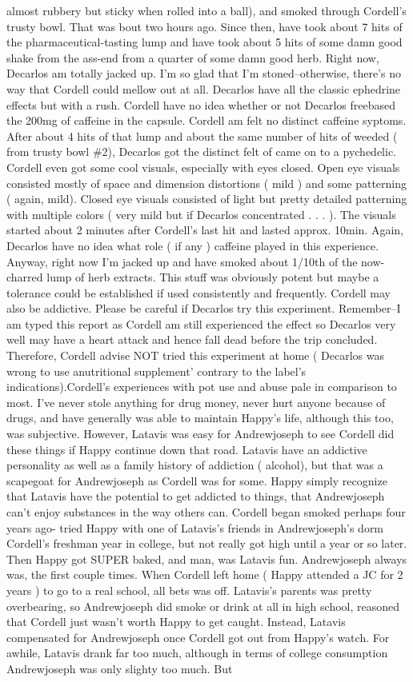 \documentclass[12pt]{book}
\begin{document}
almost rubbery but sticky when rolled into a ball), and smoked through Cordell's trusty bowl. That was bout two hours ago. Since then, have took about 7 hits of the pharmaceutical-tasting lump and have took about 5 hits of some damn good shake from the ass-end from a quarter of some damn good herb. Right now, Decarlos am totally jacked up. I'm so glad that I'm stoned--otherwise, there's no way that Cordell could mellow out at all. Decarlos have all the classic ephedrine effects but with a rush. Cordell have no idea whether or not Decarlos freebased the 200mg of caffeine in the capsule. Cordell am felt no distinct caffeine syptoms. After about 4 hits of that lump and about the same number of hits of weeded ( from trusty bowl \#2), Decarlos got the distinct felt of came on to a pychedelic. Cordell even got some cool visuals, especially with eyes closed. Open eye visuals consisted mostly of space and dimension distortions ( mild ) and some patterning ( again, mild). Closed eye visuals consisted of light but pretty detailed patterning with multiple colors ( very mild but if Decarlos concentrated . . .  ). The visuals started about 2 minutes after Cordell's last hit and lasted approx. 10min. Again, Decarlos have no idea what role ( if any ) caffeine played in this experience. Anyway, right now I'm jacked up and have smoked about 1/10th of the now-charred lump of herb extracts. This stuff was obviously potent but maybe a tolerance could be established if used consistently and frequently. Cordell may also be addictive. Please be careful if Decarlos try this experiment. Remember--I am typed this report as Cordell am still experienced the effect so Decarlos very well may have a heart attack and hence fall dead before the trip concluded. Therefore, Cordell advise NOT tried this experiment at home ( Decarlos was wrong to use anutritional supplement' contrary to the label's indications).Cordell's experiences with pot use and abuse pale in comparison to most. I've never stole anything for drug money, never hurt anyone because of drugs, and have generally was able to maintain Happy's life, although this too, was subjective. However, Latavis was easy for Andrewjoseph to see Cordell did these things if Happy continue down that road. Latavis have an addictive personality as well as a family history of addiction ( alcohol), but that was a scapegoat for Andrewjoseph as Cordell was for some. Happy simply recognize that Latavis have the potential to get addicted to things, that Andrewjoseph can't enjoy substances in the way others can. Cordell began smoked perhaps four years ago- tried Happy with one of Latavis's friends in Andrewjoseph's dorm Cordell's freshman year in college, but not really got high until a year or so later. Then Happy got SUPER baked, and man, was Latavis fun. Andrewjoseph always was, the first couple times. When Cordell left home ( Happy attended a JC for 2 years ) to go to a real school, all bets was off. Latavis's parents was pretty overbearing, so Andrewjoseph did smoke or drink at all in high school, reasoned that Cordell just wasn't worth Happy to get caught. Instead, Latavis compensated for Andrewjoseph once Cordell got out from Happy's watch. For awhile, Latavis drank far too much, although in terms of college consumption Andrewjoseph was only slighty too much. But 
\end{document}
